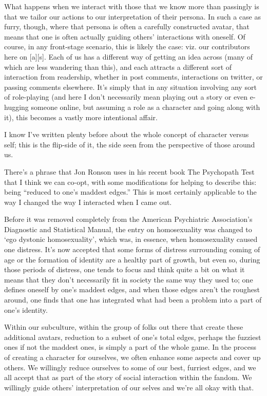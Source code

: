 What happens when we interact with those that we know more than passingly is that we tailor our actions to our interpretation of their persona.  In such a case as furry, though, where that persona is often a carefully constructed avatar, that means that one is often actually guiding others' interactions with oneself.  Of course, in any front-stage scenario, this is likely the case: viz. our contributors here on [a][s].  Each of us has a different way of getting an idea across (many of which are less wandering than this), and each attracts a different sort of interaction from readership, whether in post comments, interactions on twitter, or passing comments elsewhere.  It's simply that in any situation involving any sort of role-playing (and here I don't necessarily mean playing out a story or even e-hugging someone online, but assuming a role as a character and going along with it), this becomes a vastly more intentional affair.

I know I've written plenty before about the whole concept of character versus self; this is the flip-side of it, the side seen from the perspective of those around us.

There's a phrase that Jon Ronson uses in his recent book The Psychopath Test that I think we can co-opt, with some modifications for helping to describe this: being ``reduced to one's maddest edges.''  This is most certainly applicable to the way I changed the way I interacted when I came out.

Before it was removed completely from the American Psychiatric Association's Diagnostic and Statistical Manual, the entry on homosexuality was changed to `ego dystonic homosexuality', which was, in essence, when homosexuality caused one distress.  It's now accepted that some forms of distress surrounding coming of age or the formation of identity are a healthy part of growth, but even so, during those periods of distress, one tends to focus and think quite a bit on what it means that they don't necessarily fit in society the same way they used to; one defines oneself by one's maddest edges, and when those edges aren't the roughest around, one finds that one has integrated what had been a problem into a part of one's identity.

Within our subculture, within the group of folks out there that create these additional avatars, reduction to a subset of one's total edges, perhaps the fuzziest ones if not the maddest ones, is simply a part of the whole game.  In the process of creating a character for ourselves, we often enhance some aspects and cover up others. We willingly reduce ourselves to some of our best, furriest edges, and we all accept that as part of the story of social interaction within the fandom.  We willingly guide others' interpretation of our selves and we're all okay with that.

